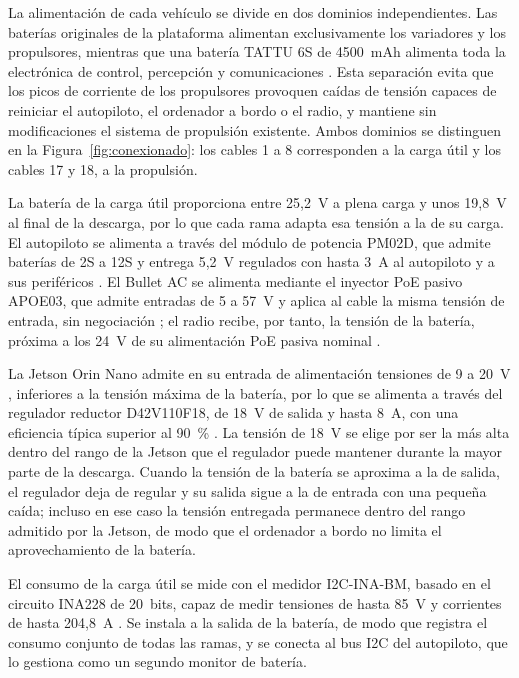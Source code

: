 La alimentación de cada vehículo se divide en dos dominios independientes. Las baterías originales de la plataforma 
alimentan exclusivamente los variadores y los propulsores, mientras que una batería TATTU 6S de 4500~mAh alimenta toda 
la electrónica de control, percepción y comunicaciones \cite{Cite22}. Esta separación evita que los picos de corriente 
de los propulsores provoquen caídas de tensión capaces de reiniciar el autopiloto, el ordenador a bordo o el radio, 
y mantiene sin modificaciones el sistema de propulsión existente. Ambos dominios se distinguen en la 
Figura~\ref{fig:conexionado}: los cables 1 a 8 corresponden a la carga útil y los cables 17 y 18, a la propulsión.
 
 
La batería de la carga útil proporciona entre 25,2~V a plena carga y unos 19,8~V al final de la descarga, por lo que 
cada rama adapta esa tensión a la de su carga. El autopiloto se alimenta a través del módulo de potencia PM02D, que 
admite baterías de 2S a 12S y entrega 5,2~V regulados con hasta 3~A al autopiloto y a sus periféricos 
\cite{holybro_pm02d}. El Bullet AC se alimenta mediante el inyector PoE pasivo APOE03, que admite entradas de 5 a 
57~V y aplica al cable la misma tensión de entrada, sin negociación \cite{apoe03}; el radio recibe, por tanto, la 
tensión de la batería, próxima a los 24~V de su alimentación PoE pasiva nominal \cite{bulletac}. 
 
La Jetson Orin Nano admite en su entrada de alimentación tensiones de 9 a 20~V \cite{jetson_orin_nano}, inferiores a la 
tensión máxima de la batería, por lo que se alimenta a través del regulador reductor D42V110F18, de 18~V de salida y 
hasta 8~A, con una eficiencia típica superior al 90~\% \cite{pololu_d42v110f18}. La tensión de 18~V se elige por ser la 
más alta dentro del rango de la Jetson que el regulador puede mantener durante la mayor parte de la descarga. Cuando la 
tensión de la batería se aproxima a la de salida, el regulador deja de regular y su salida sigue a la de entrada con 
una pequeña caída; incluso en ese caso la tensión entregada permanece dentro del rango admitido por la Jetson, de modo 
que el ordenador a bordo no limita el aprovechamiento de la batería.
 
El consumo de la carga útil se mide con el medidor I2C-INA-BM, basado en el circuito INA228 de 20~bits, capaz de medir 
tensiones de hasta 85~V y corrientes de hasta 204,8~A \cite{Cite21}. Se instala a la salida de la batería, de modo 
que registra el consumo conjunto de todas las ramas, y se conecta al bus I2C del autopiloto, que lo gestiona como un 
segundo monitor de batería. %

